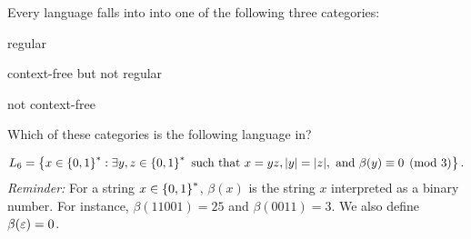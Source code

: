 \begin{problem}
  Every language falls into into one of the following three categories:
  \begin{enumroman}
    \item regular
    \item context-free but not regular
    \item not context-free
  \end{enumroman}
  Which of these categories is the following language in?

  \[
    L_6 = \left\{ x \in \left\{0, 1\right\}^* : \exists y, z \in \left\{0, 1\right\}^*
    \text{ such that } x = yz, \lvert y\rvert = \lvert z\rvert,
    \text{ and $\beta(y) \equiv 0 \pmod 3 $}\right\}.
  \]
  \emph{Reminder:} For a string $x \in \left\{0, 1\right\}^*$, $\beta(x)$ is the
  string $x$ interpreted as a binary number.
  For instance, $\beta(11001) = 25$ and $\beta(0011) = 3$.
  We also define $\beta(\varepsilon) = 0$.
\end{problem}
\begin{Answer}
  
\end{Answer}
